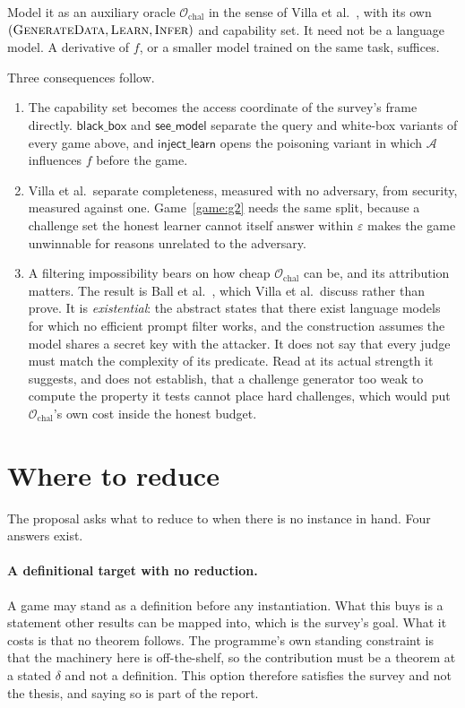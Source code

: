 \documentclass[11pt]{article}
\theoremstyle{definition}
\theoremstyle{plain}
\newcommand{\A}{\mathcal{A}}
\newcommand{\Oracle}{\mathcal{O}}
\newcommand{\INFER}{\textsc{Infer}}
\newcommand{\LEARN}{\textsc{Learn}}
\newcommand{\GEN}{\textsc{GenerateData}}
\begin{document}
Model it as an auxiliary oracle $\Oracle_{\mathrm{chal}}$ in the sense of Villa et
al.~\cite{VDKMR26}, with its own $(\GEN, \LEARN, \INFER)$ and capability set. It
need not be a language model. A derivative of $f$, or a smaller model trained on
the same task, suffices.

Three consequences follow.

\begin{enumerate}
  \item The capability set becomes the access coordinate of the survey's frame
        directly. $\mathsf{black\_box}$ and $\mathsf{see\_model}$ separate the query
        and white-box variants of every game above, and $\mathsf{inject\_learn}$
        opens the poisoning variant in which $\A$ influences $f$ before the game.
  \item Villa et al.\ separate completeness, measured with no adversary, from
        security, measured against one. Game~\ref{game:g2} needs the same split,
        because a challenge set the honest learner cannot itself answer within
        $\varepsilon$ makes the game unwinnable for reasons unrelated to the
        adversary.
  \item A filtering impossibility bears on how cheap $\Oracle_{\mathrm{chal}}$ can
        be, and its attribution matters. The result is Ball et al.~\cite{BGGKRR25},
        which Villa et al.\ discuss rather than prove. It is \emph{existential}:
        the abstract states that there exist language models for which no efficient
        prompt filter works, and the construction assumes the model shares a secret
        key with the attacker. It does not say that every judge must match the
        complexity of its predicate. Read at its actual strength it suggests, and
        does not establish, that a challenge generator too weak to compute the
        property it tests cannot place hard challenges, which would put
        $\Oracle_{\mathrm{chal}}$'s own cost inside the honest budget.
\end{enumerate}

\section{Where to reduce}
\label{sec:reduce}

The proposal asks what to reduce to when there is no instance in hand. Four answers
exist.

\paragraph{A definitional target with no reduction.} A game may stand as a
definition before any instantiation. What this buys is a statement other results
can be mapped into, which is the survey's goal. What it costs is that no theorem
follows. The programme's own standing constraint is that the machinery here is
off-the-shelf, so the contribution must be a theorem at a stated $\delta$ and not a
definition. This option therefore satisfies the survey and not the thesis, and
saying so is part of the report.
\end{document}
